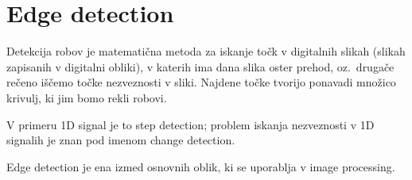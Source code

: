 \chapter{Edge detection}
Detekcija robov je matematična metoda za iskanje točk v digitalnih slikah (slikah zapisanih v digitalni obliki), v katerih ima dana slika oster prehod, oz.\ drugače rečeno iščemo točke nezveznosti v sliki. Najdene točke tvorijo ponavadi množico krivulj, ki jim bomo rekli robovi.
%
\begin{opomba}
V primeru 1D signal je to step detection; problem iskanja nezveznosti v 1D signalih je znan pod imenom change detection.
\end{opomba}
% 
Edge detection je ena izmed osnovnih oblik, ki se uporablja v image processing.